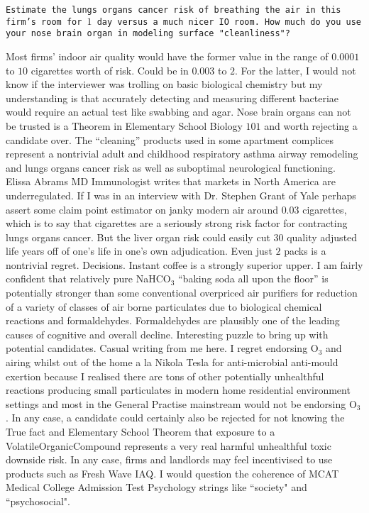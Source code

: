 \texttt{Estimate the lungs organs cancer risk of breathing the air in this firm's room for $1$ day versus a much nicer IO room. How much do you use your nose brain organ in modeling surface "cleanliness"?}

Most firms' indoor air quality would have the former value in the range of $0.0001$ to $10$ cigarettes worth of risk. Could be in $0.003$ to $2$. For the latter, I would not know if the interviewer was trolling on basic biological chemistry but my understanding is that accurately detecting and measuring different bacteriae would require an actual test like swabbing and agar. Nose brain organs can not be trusted is a Theorem in Elementary School Biology $101$ and worth rejecting a candidate over. The ``cleaning'' products used in some apartment complices represent a nontrivial adult and childhood respiratory asthma airway remodeling and lungs organs cancer risk as well as suboptimal neurological functioning. Elissa Abrams MD Immunologist writes that markets in North America are underregulated. If I was in an interview with Dr. Stephen Grant of Yale perhaps assert some claim point estimator on janky modern air around $0.03$ cigarettes, which is to say that cigarettes are a seriously strong risk factor for contracting lungs organs cancer. But the liver organ risk could easily cut $30$ quality adjusted life years off of one's life in one's own adjudication. Even just $2$ packs is a nontrivial regret. Decisions. Instant coffee is a strongly superior upper. I am fairly confident that relatively pure NaHCO$_3$ ``baking soda all upon the floor'' is potentially stronger than some conventional overpriced air purifiers for reduction of a variety of classes of air borne particulates due to biological chemical reactions and formaldehydes. Formaldehydes are plausibly one of the leading causes of cognitive and overall decline. Interesting puzzle to bring up with potential candidates. Casual writing from me here. I regret endorsing O$_3$ and airing whilst out of the home a la Nikola Tesla for anti-microbial anti-mould exertion because I realised there are tons of other potentially unhealthful reactions producing small particulates in modern home residential environment settings and most in the General Practise mainstream would not be endorsing O$_3$. In any case, a candidate could certainly also be rejected for not knowing the True fact and Elementary School Theorem that exposure to a VolatileOrganicCompound represents a very real harmful unhealthful toxic downside risk. In any case, firms and landlords may feel incentivised to use products such as Fresh Wave IAQ. I would question the coherence of MCAT Medical College Admission Test Psychology strings like ``society" and ``psychosocial".

